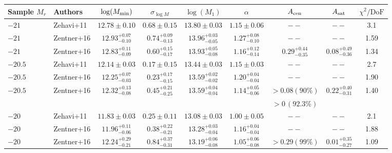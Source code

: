 \documentclass[usenatbib,usegraphicx,letterpaper]{mn2e}
\begin{document}
\begin{table}
{\renewcommand{\arraystretch}{1.3}
\renewcommand{\tabcolsep}{0.2cm}
\begin{tabular}{l l c c c c c c c}
\hline
\hline
Sample $M_r$ &  Authors & $\log (M_{\rm min})$ & $\sigma_{\log M}$ & $ \log (M_1)$ & $\alpha$ & $A_{\rm cen}$ & $A_{\rm sat}$ & $\chi^2/\mathrm{DoF}$\\
\hline
$-21$ & Zehavi+11 & $12.78 \pm 0.10$ & $0.68 \pm 0.15$ & $13.80 \pm 0.03$ & $1.15 \pm 0.06$ & $--$ & $--$ & 3.1\\
$-21$ & Zentner+16 & $12.93^{+0.07}_{-0.10}$ & $0.74^{+0.09}_{-0.13}$ & $13.96^{+0.03}_{-0.05}$ & $1.27^{+0.08}_{-0.10}$ & $--$ & $--$ & 1.59\\
$-21$ & Zentner+16 & $12.83^{+0.11}_{-0.09}$ & $0.60^{+0.15}_{-0.17}$ & $13.93^{+0.05}_{-0.08}$ & $1.16^{+0.12}_{-0.14}$ & $0.29^{+0.44}_{-0.35}$ & $0.08^{+0.49}_{-0.36}$ & 1.34 \vspace*{6pt}\\
%
$-20.5$ & Zehavi+11 & $12.14 \pm 0.03$ & $0.17 \pm 0.15$ & $13.44 \pm 0.03$ & $1.15 \pm 0.03$ & $--$ & $--$ & 2.7\\
$-20.5$ & Zentner+16 & $12.25^{+0.07}_{-0.03}$ & $0.23^{+0.17}_{-0.15}$ & $13.59^{+0.02}_{-0.02}$ & $1.20^{+0.04}_{-0.04}$ & $--$ & $--$ & 1.90\\
$-20.5$ & Zentner+16 & $12.32^{+0.13}_{-0.08}$ & $0.45^{+0.21}_{-0.25}$ & $13.59^{+0.04}_{-0.04}$ & $1.14^{+0.05}_{-0.06}$ & $>0.08 (90\%)$ & $0.22^{+0.40}_{-0.31}$ & 1.40\\
             &                     &                                         &                                        &                                        &                                      & $>0\, (92.3\%)$ &                                           &
 \vspace*{8pt}\\
%
$-20$ & Zehavi+11 & $11.83 \pm 0.03$ & $0.25 \pm 0.11$ & $13.08 \pm 0.03$ & $1.00 \pm 0.05$ & $--$ & $--$ & 2.1\\
$-20$ & Zentner+16 & $11.96^{+0.11}_{-0.06}$ & $0.38^{+0.22}_{-0.21}$ & $13.28^{+0.03}_{-0.04}$ & $1.16^{+0.04}_{-0.04}$ & $--$ & $--$ & 1.88\\
$-20$ & Zentner+16 & $12.24^{+0.29}_{-0.21}$ & $0.84^{+0.37}_{-0.31}$ & $13.19^{+0.06}_{-0.08}$ & $1.05^{+0.06}_{-0.08}$ & $ >0.29 (99\%)$ & $0.01^{+0.35}_{-0.27}$ & 1.09\\

\end{tabular}}
\end{table}
\end{document}
